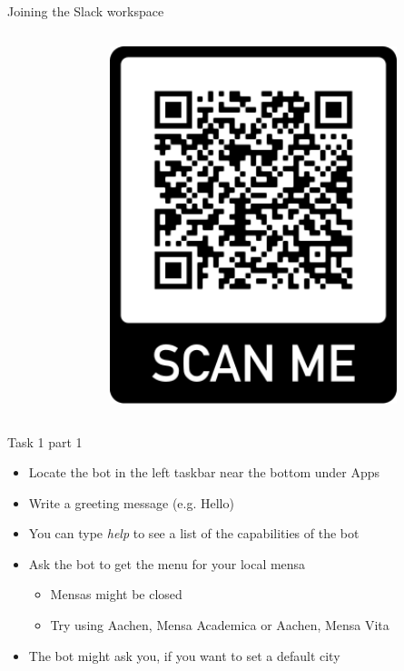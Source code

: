 \begin{frame}{Joining the Slack workspace}
\begin{columns}
\begin{column}[]{0.7\textwidth}
    \end{column}
    \begin{column}[]{0.3\textwidth}
      \begin{figure}
        \centering
        \includegraphics[width=0.9\textwidth]{frame.png}
      \end{figure}
    \end{column}
  \end{columns}
  
\end{frame}


\begin{frame}{Task 1 part 1}
  \begin{itemize}
    \item Locate the bot in the left taskbar near the bottom under Apps
    \item Write a greeting message (e.g. Hello)
    \item You can type \emph{help} to see a list of the capabilities of the bot
    \item Ask the bot to get the menu for your local mensa
    \begin{itemize}
      \item Mensas might be closed
      \item Try using Aachen, Mensa Academica or Aachen, Mensa Vita
    \end{itemize}
    \item The bot might ask you, if you want to set a default city
  \end{itemize}
\end{frame}

